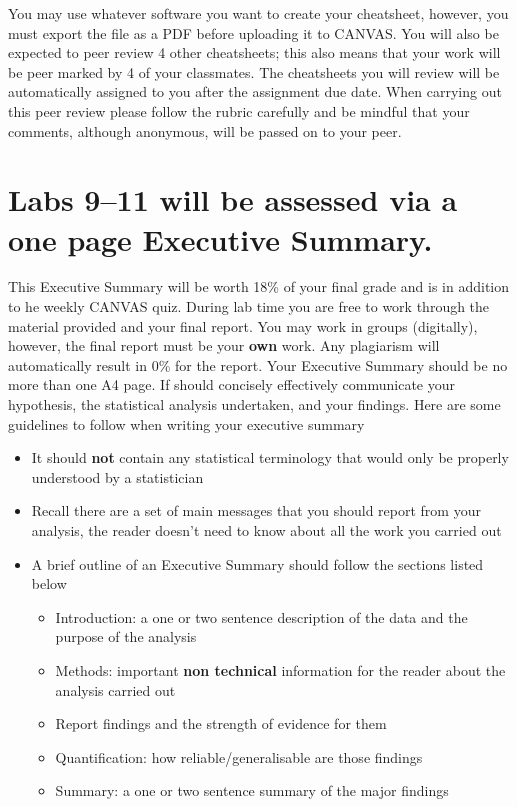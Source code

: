 \documentclass{article}
\begin{document}
You may use whatever software you want to create your cheatsheet, however, you must export the file as a PDF before uploading it to CANVAS. You will also be expected to peer review 4 other cheatsheets; this also means that your work will be peer marked by 4 of your classmates. The cheatsheets you will review will be automatically assigned to you after the assignment due date. When carrying out this peer review please follow the rubric carefully and be mindful that your comments, although anonymous, will be passed on to your peer.

\newpage

\section*{Labs 9--11 will be assessed via a one page Executive Summary.}

This Executive Summary will be worth  18\% of your final grade and is in addition to he weekly CANVAS quiz. During lab time you are free to work through the material provided and your final report. You may work in groups (digitally), however, the final report must be your \textbf{own} work. Any plagiarism will automatically result in 0\% for the report. Your Executive Summary should be no more than one A4 page. If should concisely effectively communicate your hypothesis, the statistical analysis undertaken, and your findings. Here are some guidelines to follow when writing your executive summary
\begin{itemize}
\item  It should \textbf{not} contain any statistical terminology that would only be properly understood by a statistician
  \item Recall there are a set of main messages that you should report from your analysis, the reader doesn't need to know about all the work you carried out
\item A brief outline of an Executive Summary should follow the sections listed below
  \begin{itemize}
\item Introduction: a one or two sentence description of the data and the purpose of the analysis
\item Methods: important \textbf{non technical} information for the reader about the analysis carried out
\item Report findings and the strength of evidence for them
\item Quantification: how reliable/generalisable are those findings
  \item Summary: a one or two sentence summary of the major findings
  \end{itemize}
\end{itemize}
\end{document}
